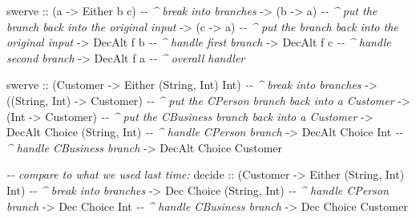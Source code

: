 \documentclass[]{article}
\newenvironment{Shaded}{}{}
\newcommand{\CommentTok}[1]{\textcolor[rgb]{0.38,0.63,0.69}{\textit{#1}}}
\newcommand{\DataTypeTok}[1]{\textcolor[rgb]{0.56,0.13,0.00}{#1}}
\newcommand{\NormalTok}[1]{#1}
\newcommand{\OtherTok}[1]{\textcolor[rgb]{0.00,0.44,0.13}{#1}}
\begin{document}
\begin{Shaded}
\begin{Highlighting}[]
\NormalTok{swerve}
\OtherTok{    ::}\NormalTok{ (a }\OtherTok{{-}>} \DataTypeTok{Either}\NormalTok{ b c)    }\CommentTok{{-}{-} \^{} break into branches}
    \OtherTok{{-}>}\NormalTok{ (b }\OtherTok{{-}>}\NormalTok{ a)             }\CommentTok{{-}{-} \^{} put the branch back into the original input}
    \OtherTok{{-}>}\NormalTok{ (c }\OtherTok{{-}>}\NormalTok{ a)             }\CommentTok{{-}{-} \^{} put the branch back into the original input}
    \OtherTok{{-}>} \DataTypeTok{DecAlt}\NormalTok{ f b           }\CommentTok{{-}{-} \^{} handle first branch}
    \OtherTok{{-}>} \DataTypeTok{DecAlt}\NormalTok{ f c           }\CommentTok{{-}{-} \^{} handle second branch}
    \OtherTok{{-}>} \DataTypeTok{DecAlt}\NormalTok{ f a           }\CommentTok{{-}{-} \^{} overall handler}

\NormalTok{swerve}
\OtherTok{    ::}\NormalTok{ (}\DataTypeTok{Customer} \OtherTok{{-}>} \DataTypeTok{Either}\NormalTok{ (}\DataTypeTok{String}\NormalTok{, }\DataTypeTok{Int}\NormalTok{) }\DataTypeTok{Int}\NormalTok{)   }\CommentTok{{-}{-} \^{} break into branches}
    \OtherTok{{-}>}\NormalTok{ ((}\DataTypeTok{String}\NormalTok{, }\DataTypeTok{Int}\NormalTok{) }\OtherTok{{-}>} \DataTypeTok{Customer}\NormalTok{)              }\CommentTok{{-}{-} \^{} put the CPerson branch back into a Customer}
    \OtherTok{{-}>}\NormalTok{ (}\DataTypeTok{Int} \OtherTok{{-}>} \DataTypeTok{Customer}\NormalTok{)                        }\CommentTok{{-}{-} \^{} put the CBusiness branch back into a Customer}
    \OtherTok{{-}>} \DataTypeTok{DecAlt} \DataTypeTok{Choice}\NormalTok{ (}\DataTypeTok{String}\NormalTok{, }\DataTypeTok{Int}\NormalTok{)              }\CommentTok{{-}{-} \^{} handle CPerson branch}
    \OtherTok{{-}>} \DataTypeTok{DecAlt} \DataTypeTok{Choice} \DataTypeTok{Int}                        \CommentTok{{-}{-} \^{} handle CBusiness branch}
    \OtherTok{{-}>} \DataTypeTok{DecAlt} \DataTypeTok{Choice} \DataTypeTok{Customer}

\CommentTok{{-}{-} compare to what we used last time:}
\NormalTok{decide}
\OtherTok{    ::}\NormalTok{ (}\DataTypeTok{Customer} \OtherTok{{-}>} \DataTypeTok{Either}\NormalTok{ (}\DataTypeTok{String}\NormalTok{, }\DataTypeTok{Int}\NormalTok{) }\DataTypeTok{Int}\NormalTok{)   }\CommentTok{{-}{-} \^{} break into branches}
    \OtherTok{{-}>} \DataTypeTok{Dec} \DataTypeTok{Choice}\NormalTok{ (}\DataTypeTok{String}\NormalTok{, }\DataTypeTok{Int}\NormalTok{)                 }\CommentTok{{-}{-} \^{} handle CPerson branch}
    \OtherTok{{-}>} \DataTypeTok{Dec} \DataTypeTok{Choice} \DataTypeTok{Int}                           \CommentTok{{-}{-} \^{} handle CBusiness branch}
    \OtherTok{{-}>} \DataTypeTok{Dec} \DataTypeTok{Choice} \DataTypeTok{Customer}
\end{Highlighting}
\end{Shaded}
\end{document}
